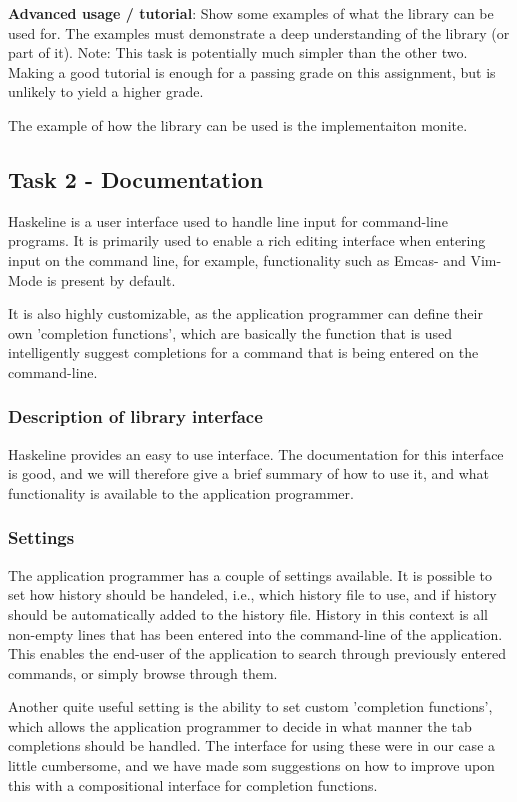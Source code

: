 \documentclass[11pt,a4paper]{article}
\begin{document}
\textbf{Advanced usage / tutorial}: Show some examples of what the library can be used
for. The examples must demonstrate a deep understanding of the library (or part
of it). Note: This task is potentially much simpler than the other two. Making a
good tutorial is enough for a passing grade on this assignment, but is unlikely
to yield a higher grade.

The example of how the library can be used is the implementaiton monite.

\subsection{Task 2 - Documentation}
Haskeline is a user interface used to handle line input for command-line
programs. It is primarily used to enable a rich editing interface when entering
input on the command line, for example, functionality such as Emcas- and
Vim-Mode is present by default.

It is also highly customizable, as the application programmer can define their
own 'completion functions', which are basically the function that is used
intelligently suggest completions for a command that is being entered on the
command-line.

\subsubsection{Description of library interface}
Haskeline provides an easy to use interface. The documentation for this
interface is good, and we will therefore give a brief summary of how to use it,
and what functionality is available to the application programmer.

\subsubsection{Settings}
The application programmer has a couple of settings available. It is possible to
set how history should be handeled, i.e., which history file to use, and if
history should be automatically added to the history file. History in this
context is all non-empty lines that has been entered into the command-line of
the application. This enables the end-user of the application to search through
previously entered commands, or simply browse through them.

Another quite useful setting is the ability to set custom 'completion
functions', which allows the application programmer to decide in what manner the
tab completions should be handled. The interface for using these were in our
case a little cumbersome, and we have made som suggestions on how to improve
upon this with a compositional interface for completion functions.
\end{document}
